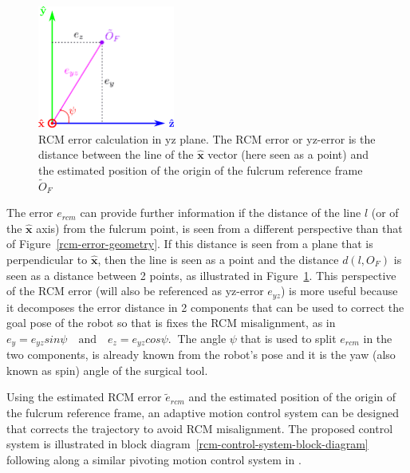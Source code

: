 \begin{center}
\begin{figure}[htbp]
\centering
\includegraphics[width=0.4\textwidth]{images/rcm-error-yz.png}
\caption{RCM error calculation in yz plane. The RCM error or yz-error is the distance between the line of the $\mathbf{\hat{x}}$ vector (here seen as a point) and the estimated position of the origin of the fulcrum reference frame $\tilde{O}_F$}
\label{rcm-error-yz-plane}
\end{figure}
\end{center}

The error $e_{rcm}$ can provide further information if the distance of the line $l$ (or of the $\mathbf{\hat{x}}$ axis) from the fulcrum point, is seen from a different perspective than that of 
Figure~\ref{rcm-error-geometry}. If this distance is seen from a plane that is perpendicular to $\mathbf{\hat{x}}$, then the line is seen as a point and the distance $d(l, O_F)$ is seen as a distance between 2 points, as illustrated in Figure~\ref{rcm-error-yz-plane}. This perspective of the RCM error (will also be referenced as yz-error $e_{yz}$) is more useful because it decomposes the error distance in 2 components that can be used to correct the goal pose of the robot so that is fixes the RCM misalignment, as in $e_y = e_{yz}sinψ \quad \textrm{and} \quad e_z = e_{yz}cosψ.~$ The angle $ψ$ that is used to split $e_{rcm}$ in the two components, is already known from the robot's pose and it is the yaw (also known as spin) angle of the surgical tool.

Using the estimated RCM error $\tilde{e}_{rcm}$ and the estimated position of the origin of the fulcrum reference frame, an adaptive motion control system can be designed that corrects the trajectory to avoid RCM misalignment. The proposed control system is illustrated in block diagram~\ref{rcm-control-system-block-diagram} following along a similar pivoting motion control system in \cite{Muoz2005PivotingMC}.

